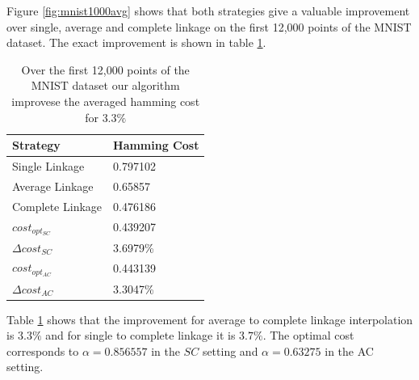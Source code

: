 Figure \ref{fig:mnist1000avg} shows that both strategies give a valuable improvement over single, average and complete linkage on the first 12,000 points of the MNIST dataset. The exact improvement is shown in table \ref{table:mnist1000avg}.

\begin{table}[h]
    \centering
    \begin{tabular}{|l | l |}
    \hline
    Strategy & Hamming Cost\\ \hline
    Single Linkage & 0.797102\\
    Average Linkage & 0.65857\\
    Complete Linkage & 0.476186\\
    $cost_{opt_{SC}}$ & 0.439207\\
    $\Delta cost_{SC}$ & 3.6979\%\\
    $cost_{opt_{AC}}$ & 0.443139\\
    $\Delta cost_{AC}$ & 3.3047\%\\\hline
    \end{tabular}
    \caption{Over the first 12,000 points of the MNIST dataset our algorithm improvese the averaged hamming cost for $3.3\%$ }
    \label{table:mnist1000avg}
\end{table}

Table \ref{table:mnist1000avg} shows that the improvement for average to complete linkage interpolation is $3.3\%$ and for single to complete linkage it is $3.7\%$. The optimal cost corresponds to $\alpha = 0.856557$ in the $SC$ setting and $\alpha = 0.63275$ in the AC setting.


